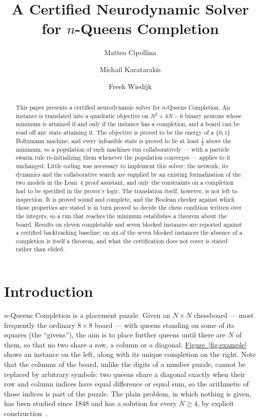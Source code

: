 \documentclass{easychair}
\title{A Certified Neurodynamic Solver for $n$-Queens Completion}
\author{
Matteo Cipollina\inst{1}
\and
Michail Karatarakis\inst{2}
\and
Freek Wiedijk\inst{2}
}
\institute{
  Axiomatic AI, Barcelona, Spain\\
  \email{matteo.cipollina@yahoo.it}
\and
  Radboud University, Nijmegen, The Netherlands\\
  \email{michail.karatarakis@ru.nl, freek@cs.ru.nl}\\
}
\newcommand{\citeref}[1]{\textcolor{academicpurple}{\cite{#1}}}
\newcommand{\figref}[1]{\textcolor{academicpurple}{\hyperref[#1]{Figure~\ref*{#1}}}}
\begin{document}
\maketitle

\begin{abstract}
This paper presents a certified neurodynamic solver for $n$-Queens Completion. An instance is
translated into a quadratic objective on $N^{2} + 4N - 6$ binary neurons whose minimum is attained
if and only if the instance has a completion, and a board can be read off any state attaining it.
The objective is proved to be the energy of a $\{0,1\}$ Boltzmann machine, and every infeasible
state is proved to lie at least $\tfrac12$ above the minimum, so a population of such machines run
collaboratively --- with a particle swarm rule re-initializing them whenever the population
converges --- applies to it unchanged. Little coding was necessary to implement this solver: the
network, its dynamics and the collaborative search are supplied by an existing formalization of the
two models in the Lean~4 proof assistant, and only the constraints on a completion had to be
specified in the prover's logic. The translation itself, however, is not left to inspection. It is
proved sound and complete, and the Boolean checker against which those properties are stated is in
turn proved to decide the chess condition written over the integers, so a run that reaches the
minimum establishes a theorem about the board. Results on eleven completable and seven blocked
instances are reported against a certified backtracking baseline; on six of the seven blocked
instances the absence of a completion is itself a theorem, and what the certification does not
cover is stated rather than elided.
\end{abstract}

\section{Introduction}\label{sec:intro}

$n$-Queens Completion is a placement puzzle. Given an $N \times N$ chessboard --- most frequently
the ordinary $8 \times 8$ board --- with queens standing on some of its squares (the
\enquote{givens}), the aim is to place further queens until there are $N$ of them, so that no two
share a row, a column or a diagonal. \figref{fig:example} shows an instance on the left, along with
its unique completion on the right. Note that the columns of the board, unlike the digits of a
number puzzle, cannot be replaced by arbitrary symbols: two queens share a diagonal exactly when
their row and column indices have equal difference or equal sum, so the arithmetic of those indices
is part of the puzzle. The plain problem, in which nothing is given, has been studied since 1848 and has a
solution for every $N \ge 4$, by explicit construction~\citeref{bell2009}.
\end{document}
